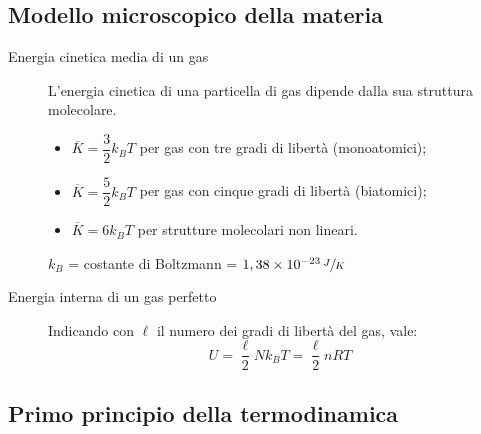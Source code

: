 \documentclass[a4paper,11pt,italian]{article}
\begin{document}
\subsection{Modello microscopico della materia}
\begin{description}
  \item[Energia cinetica media di un gas] 
  L'energia cinetica di una particella di gas dipende dalla sua struttura molecolare.
  \begin{itemize}
    \item $ \overline{K} = \dfrac{3}{2}k_B T $ per gas con tre gradi di libertà (monoatomici);
    \item $ \overline{K} = \dfrac{5}{2}k_B T $ per gas con cinque gradi di libertà (biatomici);
    \item $ \overline{K} = 6 k_B T $ per strutture molecolari non lineari.
  \end{itemize}
  $ k_B $ = costante di Boltzmann = $ 1,38 \times 10^{-23} \, \sfrac{J}{K} $

%   
  
  \item[Energia interna di un gas perfetto] 
  Indicando con $ \ell $ il numero dei gradi di libertà del gas, vale:
  \[ U = \frac{\ell}{2} N k_B T = \frac{\ell}{2} n R T  \]
\end{description}

\subsection{Primo principio della termodinamica}
\end{document}
